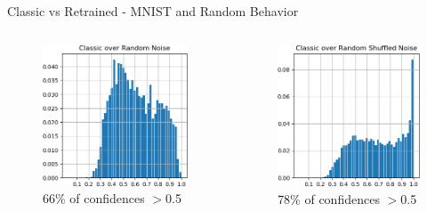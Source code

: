 \documentclass{beamer}
\begin{document}
\begin{frame}{Classic vs Retrained - MNIST and Random Behavior}
\begin{columns}
\begin{column}{.33\textwidth}
\begin{figure}
        \includegraphics[width=.9\textwidth]{images/mnist-behavior/classic-hist-random.png}
        \centering \tiny{66\% of confidences $>$0.5}
    \end{figure}
    \end{column}
    \begin{column}{.33\textwidth}
    \begin{figure}
        \includegraphics[width=.87\textwidth]{images/mnist-behavior/classic-hist-shuffled.png}
        \centering \tiny{78\% of confidences $>$0.5}
    \end{figure}
    \end{column}
    \end{columns}
    

\end{frame}
\end{document}
